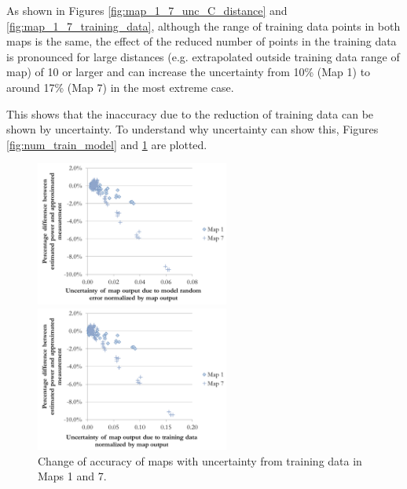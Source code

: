 As shown in Figures \ref{fig:map_1_7_unc_C_distance} and \ref{fig:map_1_7_training_data}, although the range of training data points in both maps is the same, the effect of the reduced number of points in the training data is pronounced for large distances (e.g. extrapolated outside training data range of map) of 10\dgC{} or larger and can increase the uncertainty from 10\% (Map 1) to around 17\% (Map 7) in the most extreme case.

This shows that the inaccuracy due to the reduction of training data can be shown by uncertainty. To understand why uncertainty can show this, Figures \ref{fig:num_train_model} and \ref{fig:num_train_train} are plotted.

\begin{figure}[h]
\begin{minipage}{15pc}
\includegraphics[width=15pc]{num_train_model.pdf}
\caption{\label{fig:num_train_model}Change of accuracy of maps with uncertainty from model random error in Maps 1 and 7.}
\end{minipage}\hspace{2pc}%
\begin{minipage}{15pc}
\includegraphics[width=15pc]{num_train_train.pdf}
\caption{\label{fig:num_train_train}Change of accuracy of maps with uncertainty from training data in Maps 1 and 7.}
\end{minipage} 
\end{figure}

